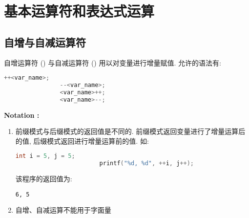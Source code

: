 \section{基本运算符和表达式运算}
    \subsection{自增与自减运算符}
        自增运算符 (\Code{++}) 与自减运算符 (\Code{--}) 用以对变量进行增量赋值. 允许的语法有:
            \begin{lstlisting}[language = {C}, gobble = 16]
                ++<var_name>;
                --<var_name>;
                <var_name>++;
                <var_name>--;
            \end{lstlisting}

        \textbf{Notation :}
            \begin{enumerate}
                \item 前缀模式与后缀模式的返回值是不同的. 前缀模式返回变量进行了增量运算后的值, 后缀模式返回进行增量运算前的值. 如:
                    \begin{lstlisting}[language = {C}, gobble = 24]
                        int i = 5, j = 5;
                        printf("%d, %d", ++i, j++);
                    \end{lstlisting}
                    该程序的返回值为:
                    \begin{lstlisting}[gobble = 24]
                        6, 5
                    \end{lstlisting}
                \item 自增、自减运算不能用于字面量
            \end{enumerate}

